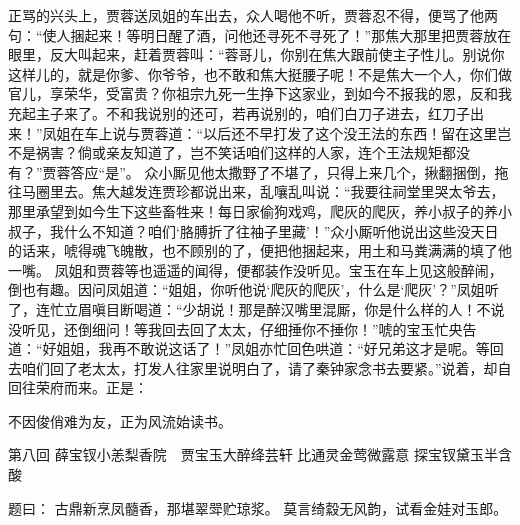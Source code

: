 \documentclass[12pt,oneside]{book}
\begin{document}
正骂的兴头上，贾蓉送凤姐的车出去，众人喝他不听，贾蓉忍不得，便骂了他两句：“使人捆起来！等明日醒了酒，问他还寻死不寻死了！”那焦大那里把贾蓉放在眼里，反大叫起来，赶着贾蓉叫：“蓉哥儿，你别在焦大跟前使主子性儿。别说你这样儿的，就是你爹、你爷爷，也不敢和焦大挺腰子呢！不是焦大一个人，你们做官儿，享荣华，受富贵？你祖宗九死一生挣下这家业，到如今不报我的恩，反和我充起主子来了。不和我说别的还可，若再说别的，咱们白刀子进去，红刀子出来！”凤姐在车上说与贾蓉道：“以后还不早打发了这个没王法的东西！留在这里岂不是祸害？倘或亲友知道了，岂不笑话咱们这样的人家，连个王法规矩都没有？”贾蓉答应“是”。
众小厮见他太撒野了不堪了，只得上来几个，揪翻捆倒，拖往马圈里去。焦大越发连贾珍都说出来，乱嚷乱叫说：“我要往祠堂里哭太爷去，那里承望到如今生下这些畜牲来！每日家偷狗戏鸡，爬灰的爬灰，养小叔子的养小叔子，我什么不知道？咱们‘胳膊折了往袖子里藏’！”众小厮听他说出这些没天日的话来，唬得魂飞魄散，也不顾别的了，便把他捆起来，用土和马粪满满的填了他一嘴。
凤姐和贾蓉等也遥遥的闻得，便都装作没听见。宝玉在车上见这般醉闹，倒也有趣。因问凤姐道：“姐姐，你听他说‘爬灰的爬灰’，什么是‘爬灰’？”凤姐听了，连忙立眉嗔目断喝道：“少胡说！那是醉汉嘴里混厮，你是什么样的人！不说没听见，还倒细问！等我回去回了太太，仔细捶你不捶你！”唬的宝玉忙央告道：“好姐姐，我再不敢说这话了！”凤姐亦忙回色哄道：“好兄弟这才是呢。等回去咱们回了老太太，打发人往家里说明白了，请了秦钟家念书去要紧。”说着，却自回往荣府而来。正是：

不因俊俏难为友，正为风流始读书。

 
第八回  薛宝钗小恙梨香院　贾宝玉大醉绛芸轩
        比通灵金莺微露意  探宝钗黛玉半含酸

题曰：
古鼎新烹凤髓香，那堪翠斝贮琼浆。
莫言绮縠无风韵，试看金娃对玉郎。
\end{document}
